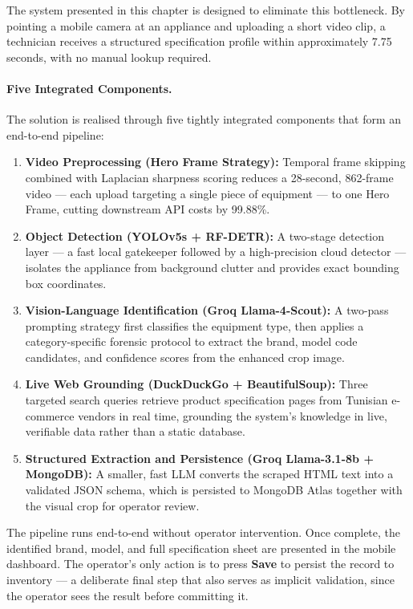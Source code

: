 The system presented in this chapter is designed to eliminate this bottleneck. By pointing a mobile camera at an appliance and uploading a short video clip, a technician receives a structured specification profile within approximately 7.75 seconds, with no manual lookup required.

\paragraph{Five Integrated Components.}

The solution is realised through five tightly integrated components that form an end-to-end pipeline:

\begin{enumerate}
  \item \textbf{Video Preprocessing (Hero Frame Strategy):} Temporal frame skipping combined with Laplacian sharpness scoring reduces a 28-second, 862-frame video — each upload targeting a single piece of equipment — to one Hero Frame, cutting downstream API costs by 99.88\%.
  \item \textbf{Object Detection (YOLOv5s + RF-DETR):} A two-stage detection layer — a fast local gatekeeper followed by a high-precision cloud detector — isolates the appliance from background clutter and provides exact bounding box coordinates.
  \item \textbf{Vision-Language Identification (Groq Llama-4-Scout):} A two-pass prompting strategy first classifies the equipment type, then applies a category-specific forensic protocol to extract the brand, model code candidates, and confidence scores from the enhanced crop image.
  \item \textbf{Live Web Grounding (DuckDuckGo + BeautifulSoup):} Three targeted search queries retrieve product specification pages from Tunisian e-commerce vendors in real time, grounding the system's knowledge in live, verifiable data rather than a static database.
  \item \textbf{Structured Extraction and Persistence (Groq Llama-3.1-8b + MongoDB):} A smaller, fast LLM converts the scraped HTML text into a validated JSON schema, which is persisted to MongoDB Atlas together with the visual crop for operator review.
\end{enumerate}

The pipeline runs end-to-end without operator intervention. Once complete, the identified brand, model, and full specification sheet are presented in the mobile dashboard. The operator's only action is to press \textbf{Save} to persist the record to inventory — a deliberate final step that also serves as implicit validation, since the operator sees the result before committing it.

